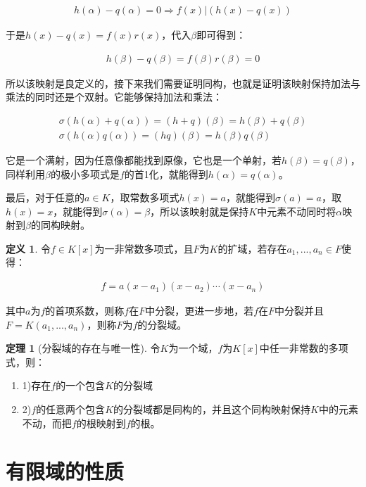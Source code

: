 \documentclass[12pt, a4paper, oneside]{ctexart}
\theoremstyle{definition}
\newtheorem*{definition}{定义}
\newtheorem*{theorem}{定理}
\begin{document}
\begin{align*}
h(\alpha)-q(\alpha)=0\Rightarrow f(x)|(h(x)-q(x))
\end{align*}

于是$h(x)-q(x)=f(x)r(x)$，代入$\beta$即可得到：

\begin{align*}
h(\beta)-q(\beta)=f(\beta)r(\beta)=0
\end{align*}

所以该映射是良定义的，接下来我们需要证明同构，也就是证明该映射保持加法与乘法的同时还是个双射。它能够保持加法和乘法：

\begin{align*}
\sigma(h(\alpha)+q(\alpha))=(h+q)(\beta)=h(\beta)+q(\beta)\\
\sigma(h(\alpha)q(\alpha))=(hq)(\beta)=h(\beta)q(\beta)
\end{align*}

它是一个满射，因为任意像都能找到原像，它也是一个单射，若$h(\beta)=q(\beta)$，同样利用$\beta$的极小多项式是$f$的首1化，就能得到$h(\alpha)=q(\alpha)$。

最后，对于任意的$a\in K$，取常数多项式$h(x)=a$，就能得到$\sigma(a)=a$，取$h(x)=x$，就能得到$\sigma(\alpha)=\beta$，所以该映射就是保持$K$中元素不动同时将$\alpha$映射到$\beta$的同构映射。

\begin{definition}
令$f\in K[x]$为一非常数多项式，且$F$为$K$的扩域，若存在$a_1,...,a_n\in F$使得：

\begin{align*}
f=a(x-a_1)(x-a_2)\cdots(x-a_n)
\end{align*}

其中$a$为$f$的首项系数，则称$f$在$F$中分裂，更进一步地，若$f$在$F$中分裂并且$F=K(a_1,...,a_n)$，则称$F$为$f$的分裂域。
\end{definition}

\begin{theorem}[分裂域的存在与唯一性]
令$K$为一个域，$f$为$K[x]$中任一非常数的多项式，则：

\begin{enumerate}
\item 1)存在$f$的一个包含$K$的分裂域
\item 2)$f$的任意两个包含$K$的分裂域都是同构的，并且这个同构映射保持$K$中的元素不动，而把$f$的根映射到$f$的根。
\end{enumerate}
\end{theorem}

\section*{有限域的性质}
\end{document}
